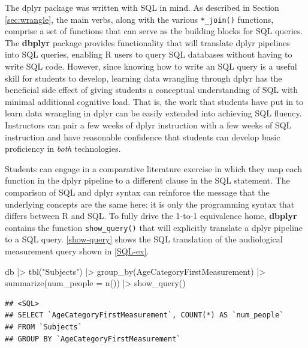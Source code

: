 \documentclass[12pt]{article}
\newenvironment{Shaded}{\begin{snugshade}}{\end{snugshade}}
\newcommand{\AttributeTok}[1]{\textcolor[rgb]{0.77,0.63,0.00}{#1}}
\newcommand{\FunctionTok}[1]{\textcolor[rgb]{0.00,0.00,0.00}{#1}}
\newcommand{\NormalTok}[1]{#1}
\newcommand{\SpecialCharTok}[1]{\textcolor[rgb]{0.00,0.00,0.00}{#1}}
\newcommand{\StringTok}[1]{\textcolor[rgb]{0.31,0.60,0.02}{#1}}
\begin{document}
The dplyr package was written with SQL in mind. As described in Section
\ref{sec:wrangle}, the main verbs, along with the various
\texttt{*\_join()} functions, comprise a set of functions that can serve
as the building blocks for SQL queries. The \textbf{dbplyr} package
provides functionality that will translate dplyr pipelines into SQL
queries, enabling R users to query SQL databases without having to write
SQL code. However, since knowing how to write an SQL query is a useful
skill for students to develop, learning data wrangling through dplyr has
the beneficial side effect of giving students a conceptual understanding
of SQL with minimal additional cognitive load. That is, the work that
students have put in to learn data wrangling in dplyr can be easily
extended into achieving SQL fluency. Instructors can pair a few weeks of
dplyr instruction with a few weeks of SQL instruction and have
reasonable confidence that students can develop basic proficiency in
\emph{both} technologies.

Students can engage in a comparative literature exercise in which they
map each function in the dplyr pipeline to a different clause in the SQL
statement. The comparison of SQL and dplyr syntax can reinforce the
message that the underlying concepts are the same here: it is only the
programming syntax that differs between R and SQL. To fully drive the
1-to-1 equivalence home, \textbf{dbplyr} contains the function
\texttt{show\_query()} that will explicitly translate a dplyr pipeline
to a SQL query. \ref{show-query} shows the SQL translation of the
audiological measurement query shown in \ref{SQL-ex}.

\linespread{1}

\begin{Shaded}
\begin{Highlighting}[]
\NormalTok{db }\SpecialCharTok{|\textgreater{}}
  \FunctionTok{tbl}\NormalTok{(}\StringTok{"Subjects"}\NormalTok{) }\SpecialCharTok{|\textgreater{}} 
  \FunctionTok{group\_by}\NormalTok{(AgeCategoryFirstMeasurement) }\SpecialCharTok{|\textgreater{}}
  \FunctionTok{summarize}\NormalTok{(}\AttributeTok{num\_people =} \FunctionTok{n}\NormalTok{()) }\SpecialCharTok{|\textgreater{}}
  \FunctionTok{show\_query}\NormalTok{()}
\end{Highlighting}
\end{Shaded}

\begin{verbatim}
## <SQL>
## SELECT `AgeCategoryFirstMeasurement`, COUNT(*) AS `num_people`
## FROM `Subjects`
## GROUP BY `AgeCategoryFirstMeasurement`
\end{verbatim}
\end{document}
